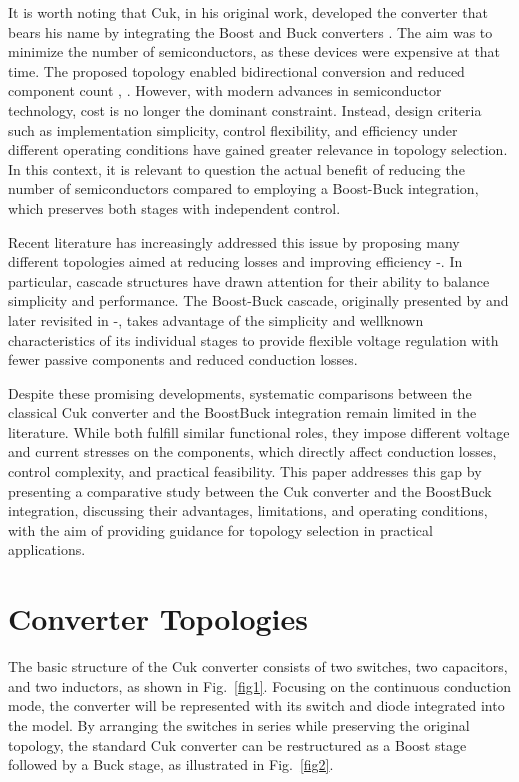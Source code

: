 \documentclass[10pt,conference]{IEEEtran}
\begin{document}
It is worth noting that Cuk, in his original work, developed the converter that bears his name by integrating the Boost and Buck converters \cite{bib1}. The aim was to minimize the number of semiconductors, as these devices were expensive at that time. The proposed topology enabled bidirectional conversion and reduced component count \cite{bib1}, \cite{bib2}. However, with modern advances in semiconductor technology, cost is no longer the dominant constraint. Instead, design criteria such as implementation simplicity, control flexibility, and efficiency under different operating conditions have gained greater relevance in topology selection. In this context, it is relevant to question the actual benefit of reducing the number of semiconductors compared to employing a Boost-Buck integration, which preserves both stages with independent control.

Recent literature has increasingly addressed this issue by proposing many different topologies aimed at reducing losses and improving efficiency \cite{bib8}-\cite{bib12}. In particular, cascade structures have drawn attention for their ability to balance simplicity and performance. The Boost-Buck cascade, originally presented by \cite{bib13} and later revisited in \cite{bib14}-\cite{bib16}, takes advantage of the simplicity and wellknown characteristics of its individual stages to provide flexible voltage regulation with fewer passive components and reduced conduction losses.

Despite these promising developments, systematic comparisons between the classical Cuk converter and the BoostBuck integration remain limited in the literature. While both fulfill similar functional roles, they impose different voltage and current stresses on the components, which directly affect conduction losses, control complexity, and practical feasibility. This paper addresses this gap by presenting a comparative study between the Cuk converter and the BoostBuck integration, discussing their advantages, limitations, and operating conditions, with the aim of providing guidance for topology selection in practical applications.

\section[II]{Converter Topologies}
The basic structure of the Cuk converter consists of two switches, two capacitors, and two inductors, as shown in Fig.~\ref{fig1}. Focusing on the continuous conduction mode, the converter will be represented with its switch and diode integrated into the model. By arranging the switches in series while preserving the original topology, the standard Cuk converter can be restructured as a Boost stage followed by a Buck stage, as illustrated in Fig.~\ref{fig2}.
\end{document}
